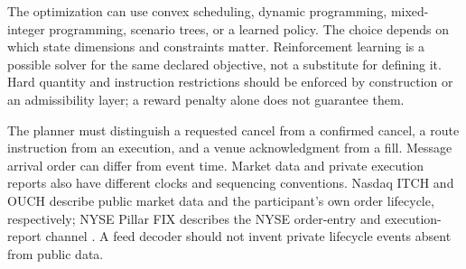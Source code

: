 \documentclass[11pt]{article}
\numberwithin{equation}{section}
\theoremstyle{definition}
\theoremstyle{remark}
\theoremstyle{definition}
\begin{document}
\begin{center}
\end{center}

The optimization can use convex scheduling, dynamic programming, mixed-integer
programming, scenario trees, or a learned policy. The choice depends on which
state dimensions and constraints matter. Reinforcement learning is a possible
solver for the same declared objective, not a substitute for defining it.
Hard quantity and instruction restrictions should be enforced by construction
or an admissibility layer; a reward penalty alone does not guarantee them.

The planner must distinguish a requested cancel from a confirmed cancel,
a route instruction from an execution, and a venue acknowledgment from a
fill. Message arrival order can differ from event time. Market data and private
execution reports also have different clocks and sequencing conventions.
Nasdaq ITCH and OUCH describe public market data and the participant's own
order lifecycle, respectively; NYSE Pillar FIX describes the NYSE order-entry
and execution-report channel \citep{itch,ouch,nysefix}. A feed decoder should
not invent private lifecycle events absent from public data.
\end{document}
